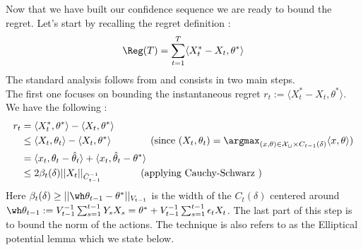 \noindent
Now that we have built our confidence sequence we are ready to bound the regret. Let's start by recalling the regret definition : 
\[\Reg(T) = \sum_{t=1}^T \langle X_t^*-X_t,\theta^*\rangle\]
The standard analysis follows from \cite{abbasi2011improved} and consists in two main steps.
\\

\noindent The first one focuses on bounding the instantaneous regret $r_t := \langle X_t^*-X_t,\theta^*\rangle.$ We have the following : 
    \begin{align*}
        r_t &= \langle X_t^*,\theta^*\rangle - \langle X_t,\theta^*\rangle\\
        &\leq \langle X_t,\theta_t\rangle - \langle X_t,\theta^*\rangle \qquad \qquad \text{(since $(X_t,\theta_t) = \argmax_{(x,\theta) \in \mathcal{X_t} \times C_{t-1}(\delta)} \langle x,\theta\rangle $)} \\
        &= \langle x_t,\theta_t - \hat \theta_t \rangle + \langle x_t,\hat \theta_t - \theta^*\rangle \\
        &\leq 2\beta_{t}(\delta)||X_t||_{\bar C_{t-1}^{-1}} \qquad \qquad \text{(applying Cauchy-Schwarz )}
    \end{align*}
   Here $\beta_t(\delta)\geq ||\wh \theta_{t-1} - \theta^*||_{V_{t-1}}$ is the width of the $C_t(\delta)$ centered around $\wh \theta_{t-1}:= V_{t-1}^{-1}\sum_{s=1}^{t-1}Y_sX_s=\theta^*+V_{t-1}^{-1}\sum_{s=1}^{t-1}\epsilon_tX_t$.
The last part of this step is to bound the norm of the actions. The technique is also refers to as the Elliptical potential lemma which we state below.